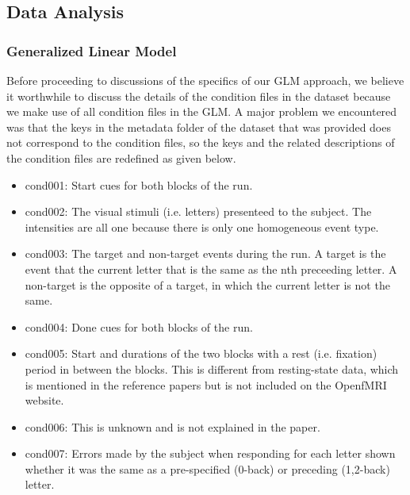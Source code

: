 \documentclass[11pt]{article}
\begin{document}
\subsection{Data Analysis}

\subsubsection{Generalized Linear Model}

Before proceeding to discussions of the specifics of our GLM approach, we believe it worthwhile to discuss the details of the condition files in the dataset because we make use of all condition files in the GLM. A major problem we encountered was that the keys in the metadata folder of the dataset that was provided does not correspond to the condition files, so the keys and the related descriptions of the condition files are redefined as given below. 

\begin{itemize}

\item cond001: Start cues for both blocks of the run.

\item cond002: The visual stimuli (i.e. letters) presenteed to the subject. The
intensities are all one because there is only one homogeneous event type.

\item cond003: The target and non-target events during the run. A target is the event
that the current letter that is the same as the nth preceeding letter. A non-target is the opposite
of a target, in which the current letter is not the same. 

\item cond004: Done cues for both blocks of the run.

\item cond005: Start and durations of the two blocks with a rest (i.e. fixation)
period in between the blocks. This is different from resting-state data, which
is mentioned in the reference papers but is not included on the OpenfMRI
website. 

\item cond006: This is unknown and is not explained in the paper.

\item cond007: Errors made by the subject when responding for each letter shown
whether it was the same as a pre-specified (0-back) or preceding (1,2-back)
letter.

\end{itemize}
\end{document}

